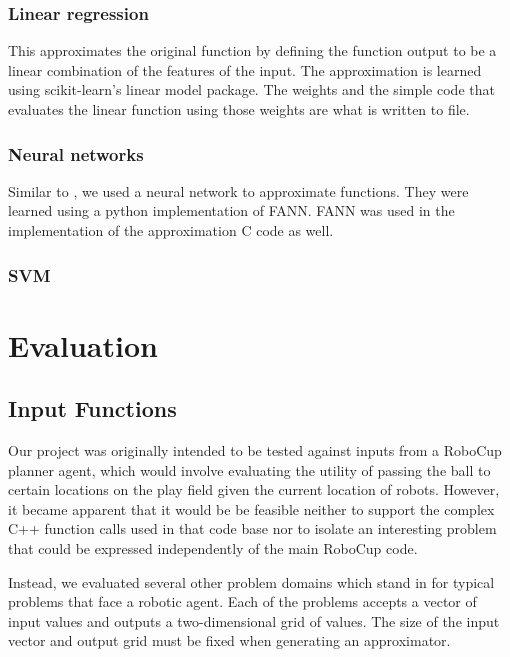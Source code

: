 \documentclass{article}
\begin{document}
\subsubsection{Linear regression}

This approximates the original function by defining the function output to be a linear combination of the features of the input. The approximation is learned using scikit-learn's linear model package. The weights and the simple code that evaluates the linear function using those weights are what is written to file.

\subsubsection{Neural networks}

Similar to \cite{Esmaeilzadeh12}, we used a neural network to approximate functions. They were learned using a python implementation of FANN. FANN was used in the implementation of the approximation C code as well. %

\subsubsection{SVM}


\section{Evaluation}

\subsection{Input Functions}

Our project was originally intended to be tested against inputs from a RoboCup planner agent, which would involve evaluating the utility of passing the ball to certain locations on the play field given the current location of robots. However, it became apparent that it would be be feasible neither to support the complex C++ function calls used in that code base nor to isolate an interesting problem that could be expressed independently of the main RoboCup code.

Instead, we evaluated several other problem domains which stand in for typical problems that face a robotic agent. Each of the problems accepts a vector of input values and outputs a two-dimensional grid of values. The size of the input vector and output grid must be fixed when generating an approximator.
\end{document}
